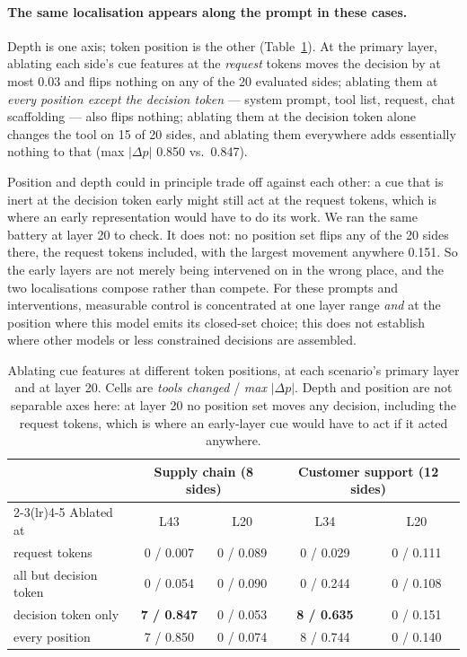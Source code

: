 \documentclass{article}
\begin{document}
\paragraph{The same localisation appears along the prompt in these cases.} Depth is one axis; token position is the other (Table~\ref{tab:positions}). At the primary layer, ablating each side's cue features at the \emph{request} tokens moves the decision by at most 0.03 and flips nothing on any of the 20 evaluated sides; ablating them at \emph{every position except the decision token} --- system prompt, tool list, request, chat scaffolding --- also flips nothing; ablating them at the decision token alone changes the tool on 15 of 20 sides, and ablating them everywhere adds essentially nothing to that (max $|\Delta p|$ 0.850 vs.\ 0.847).

Position and depth could in principle trade off against each other: a cue that is inert at the decision token early might still act at the request tokens, which is where an early representation would have to do its work. We ran the same battery at layer 20 to check. It does not: no position set flips any of the 20 sides there, the request tokens included, with the largest movement anywhere 0.151. So the early layers are not merely being intervened on in the wrong place, and the two localisations compose rather than compete. For these prompts and interventions, measurable control is concentrated at one layer range \emph{and} at the position where this model emits its closed-set choice; this does not establish where other models or less constrained decisions are assembled.

\begin{table}[t]
\caption{Ablating cue features at different token positions, at each scenario's primary layer and at layer 20. Cells are \emph{tools changed} / \emph{max} $|\Delta p|$. Depth and position are not separable axes here: at layer 20 no position set moves any decision, including the request tokens, which is where an early-layer cue would have to act if it acted anywhere.}
\label{tab:positions}
\centering
\small
\setlength{\tabcolsep}{5pt}
\begin{tabular}{lcccc}
\toprule
& \multicolumn{2}{c}{Supply chain (8 sides)} & \multicolumn{2}{c}{Customer support (12 sides)} \\
\cmidrule(lr){2-3}\cmidrule(lr){4-5}
Ablated at & L43 & L20 & L34 & L20 \\
\midrule
request tokens          & 0 / 0.007 & 0 / 0.089 & 0 / 0.029 & 0 / 0.111 \\
all but decision token  & 0 / 0.054 & 0 / 0.090 & 0 / 0.244 & 0 / 0.108 \\
decision token only     & \textbf{7 / 0.847} & 0 / 0.053 & \textbf{8 / 0.635} & 0 / 0.151 \\
every position          & 7 / 0.850 & 0 / 0.074 & 8 / 0.744 & 0 / 0.140 \\
\bottomrule
\end{tabular}
\end{table}
\end{document}

